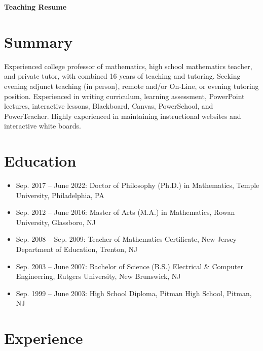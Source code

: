 \documentclass[11pt]{article}
\begin{document}
\begin{center}
    {\LARGE \textbf{Teaching Resume}}\\[1ex]
\end{center}

\section*{Summary}
Experienced college professor of mathematics, high school mathematics teacher, and private tutor, with combined 16 years of teaching and tutoring. Seeking evening adjunct teaching (in person), remote and/or On-Line, or evening tutoring position. Experienced in writing curriculum, learning assessment, PowerPoint lectures, interactive lessons, Blackboard, Canvas, PowerSchool, and PowerTeacher. Highly experienced in maintaining instructional websites and interactive white boards.

\section*{Education}
\begin{itemize}[leftmargin=*]
    \item Sep. 2017 -- June 2022: Doctor of Philosophy (Ph.D.) in Mathematics, Temple University, Philadelphia, PA
    \item Sep. 2012 -- June 2016: Master of Arts (M.A.) in Mathematics, Rowan University, Glassboro, NJ
    \item Sep. 2008 -- Sep. 2009: Teacher of Mathematics Certificate, New Jersey Department of Education, Trenton, NJ
    \item Sep. 2003 -- June 2007: Bachelor of Science (B.S.) Electrical \& Computer Engineering, Rutgers University, New Brunswick, NJ
    \item Sep. 1999 -- June 2003: High School Diploma, Pitman High School, Pitman, NJ
\end{itemize}

\section*{Experience}
\end{document}

